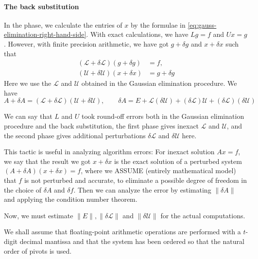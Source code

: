 \documentclass[../main.tex]{subfiles}
\begin{document}
\paragraph{The back substitution} In the phase, we calculate the entries of $x$ by the formulae in \eqref{eq:gauss-elimination-right-hand-side}. With exact calculations, we have $L g = f$ and $U x = g$. However, with finite precision arithmetic, we have got $g + \delta g$ and $x + \delta x$ such that
\begin{equation*}
	\begin{aligned}
		(\mathcal{L} + \delta \mathcal{L})(g + \delta g) & = f,           \\
		(\mathcal{U} + \delta \mathcal{U})(x + \delta x) & = g + \delta g
	\end{aligned}
\end{equation*}
Here we use the $\mathcal{L}$ and $\mathcal{U}$ obtained in the Gaussian elimination procedure. We have
\begin{equation*}
	A + \delta A = (\mathcal{L} + \delta \mathcal{L})(\mathcal{U} + \delta \mathcal{U}), \qquad \delta A = E + \mathcal{L} (\delta \mathcal{U}) + (\delta \mathcal{L}) \mathcal{U} + (\delta \mathcal{L})(\delta \mathcal{U})
\end{equation*}
\begin{remark}
	We can say that $L$ and $U$ took round-off errors both in the Gaussian elimination procedure and the back substitution, the first phase gives inexact $\mathcal{L}$ and $\mathcal{U}$, and the second phase gives additional perturbations $\delta \mathcal{L}$ and $\delta \mathcal{U}$ here.

	This tactic is useful in analyzing algorithm errors: For inexact solution $A x = f$, we say that the result we got $x + \delta x$ is the exact solution of a perturbed system $(A + \delta A)(x + \delta x) = f$, where we ASSUME (entirely mathematical model) that $f$ is not perturbed and accurate, to eliminate a possible degree of freedom in the choice of $\delta A$ and $\delta f$. Then we can analyze the error by estimating $\| \delta A \|$ and applying the condition number theorem.
\end{remark}

Now, we must estimate $\| E \|, \| \delta \mathcal{L} \|$ and $\| \delta \mathcal{U} \|$ for the actual computations.

We shall assume that floating-point arithmetic operations are performed with a $t$-digit decimal mantissa and that the system has been ordered so that the natural order of pivots is used.
\end{document}

